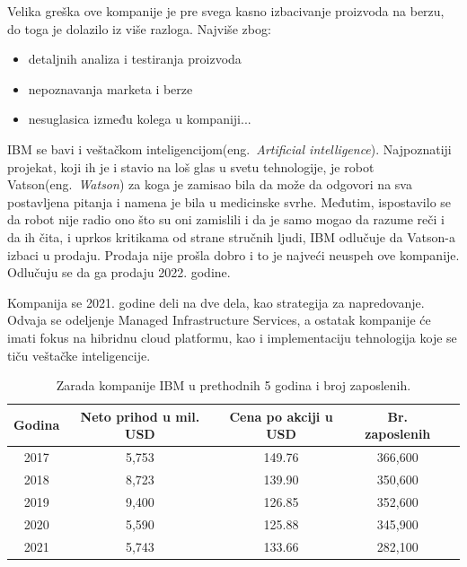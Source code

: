 \documentclass[a4paper]{article}
\begin{document}
Velika greška ove kompanije je pre svega kasno izbacivanje proizvoda na berzu, do toga je dolazilo iz više razloga. Najviše zbog:

\begin{itemize}
\item detaljnih analiza i testiranja proizvoda
\item nepoznavanja marketa i berze
\item nesuglasica između kolega u kompaniji...
\end{itemize}

IBM se bavi i veštačkom inteligencijom(eng.~{\em Artificial intelligence}). Najpoznatiji projekat, koji ih je i stavio na loš glas u svetu tehnologije, je robot Vatson(eng.~{\em Watson}) za koga je zamisao bila da može da odgovori na sva postavljena pitanja i namena je bila u medicinske svrhe\cite{ibm}. Međutim, ispostavilo se da robot nije radio ono što su oni zamislili i da je samo mogao da razume reči i da ih čita, i uprkos kritikama od strane stručnih ljudi, IBM odlučuje da Vatson-a izbaci u prodaju. Prodaja nije prošla dobro i to je najveći neuspeh ove kompanije. Odlučuju se da ga prodaju 2022. godine.

Kompanija se 2021. godine deli na dve dela, kao strategija za napredovanje. Odvaja se odeljenje Managed Infrastructure Services, a ostatak kompanije će imati fokus na hibridnu cloud platformu, kao i implementaciju tehnologija koje se tiču veštačke inteligencije.


\begin{table}[h!]
\begin{center}
\caption{Zarada kompanije IBM u prethodnih 5 godina i broj zaposlenih. \cite{tabela}}
\begin{tabular}{|c|c|c|c|c|} \hline
Godina& Neto prihod u mil. USD& Cena po akciji u USD& Br. zaposlenih \\ \hline
2017	&5,753		&149.76	&366,600\\ \hline
2018	&8,723		&139.90	&350,600\\ \hline
2019	&9,400		&126.85	&352,600\\ \hline
2020	&5,590	  &125.88	&345,900\\ \hline
2021	&5,743		&133.66	&282,100\\ \hline
\end{tabular}
\label{tab:tabela1}
\end{center}
\end{table}
\end{document}
